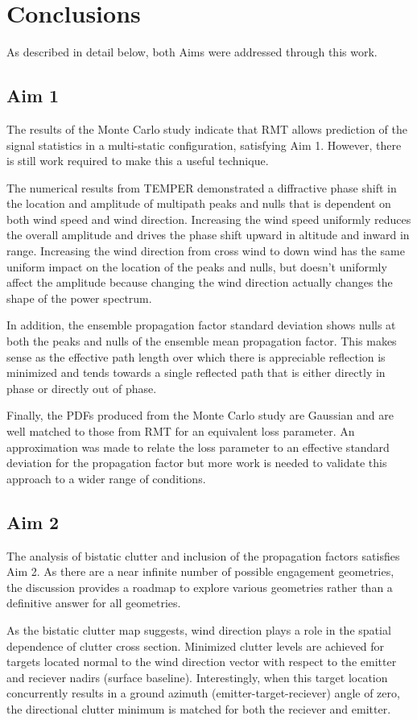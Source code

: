 \renewcommand{\baselinestretch}{2} \small\normalsize
\section{Conclusions}
As described in detail below, both Aims were addressed through this work.

\subsection{Aim 1}
The results of the Monte Carlo study indicate that RMT allows prediction of the signal statistics in a multi-static configuration, satisfying Aim 1. However, there is still work required to make this a useful technique. 

The numerical results from TEMPER demonstrated a diffractive phase shift in the location and amplitude of multipath peaks and nulls that is dependent on both wind speed and wind direction. Increasing the wind speed uniformly reduces the overall amplitude and drives the phase shift upward in altitude and inward in range. Increasing the wind direction from cross wind to down wind has the same uniform impact on the location of the peaks and nulls, but doesn't uniformly affect the amplitude because changing the wind direction actually changes the shape of the power spectrum.

In addition, the ensemble propagation factor standard deviation shows nulls at both the peaks and nulls of the ensemble mean propagation factor. This makes sense as the effective path length over which there is appreciable reflection is minimized and tends towards a single reflected path that is either directly in phase or directly out of phase.

Finally, the PDFs produced from the Monte Carlo study are Gaussian and are well matched to those from RMT for an equivalent loss parameter. An approximation was made to relate the loss parameter to an effective standard deviation for the propagation factor but more work is needed to validate this approach to a wider range of conditions.

\subsection{Aim 2}
The analysis of bistatic clutter and inclusion of the propagation factors satisfies Aim 2. As there are a near infinite number of possible engagement geometries, the discussion provides a roadmap to explore various geometries rather than a definitive answer for all geometries.

As the bistatic clutter map suggests, wind direction plays a role in the spatial dependence of clutter cross section. Minimized clutter levels are achieved for targets located normal to the wind direction vector with respect to the emitter and reciever nadirs (surface baseline). Interestingly, when this target location concurrently results in a ground azimuth (emitter-target-reciever) angle of zero, the directional clutter minimum is matched for both the reciever and emitter.